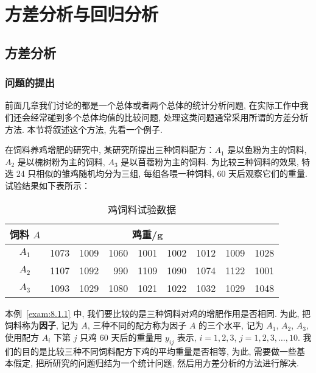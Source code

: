 \setcounter{chapter}{7}
\chapter{方差分析与回归分析}\label{cha:8}

\section{方差分析}\label{sec:8.1}
\subsection{问题的提出}
前面几章我们讨论的都是一个总体或者两个总体的统计分析问题, 在实际工作中我们还会经常碰到多个总体均值的比较问题, 处理这类问题通常采用所谓的方差分析方法. 本节将叙述这个方法, 先看一个例子.

\begin{example}\label{exam:8.1.1}
在饲料养鸡增肥的研究中, 某研究所提出三种饲料配方：$A_1$ 是以鱼粉为主的饲料, $A_2$ 是以槐树粉为主的饲料, $A_3$ 是以苜蓿粉为主的饲料. 为比较三种饲料的效果, 特选 24 只相似的雏鸡随机均分为三组, 每组各喂一种饲料, 60 天后观察它们的重量. 试验结果如下表所示：

\begin{table}[htbp]
  \centering
  \caption{鸡饲料试验数据}
    \begin{tabular}{c|rrrrrrrr}
    \toprule
    饲料 $A$   & \multicolumn{7}{c}{鸡重/\si{\gram}                     } &      \\
    \midrule
    $A_1$  & 1073  & 1009  & 1060  & 1001  & 1002  & 1012  & 1009  & 1028 \\
    $A_2$  & 1107  & 1092  & 990   & 1109  & 1090  & 1074  & 1122  & 1001 \\
    $A_3$  & 1093  & 1029  & 1080  & 1021  & 1022  & 1032  & 1029  & 1048 \\
    \bottomrule
    \end{tabular}%
  \label{tab:8.1.1}%
\end{table}%
\end{example}

本例~\ref{exam:8.1.1} 中, 我们要比较的是三种饲料对鸡的增肥作用是否相同. 为此, 把饲料称为\textbf{因子}, 记为 $A$, 三种不同的配方称为因子 $A$ 的三个水平, 记为 $A_1$, $A_2$, $A_3$, 使用配方 $A_i$ 下第 $j$ 只鸡 60 天后的重量用 $y_{ij}$ 表示, $i = 1,2,3$, $j =1,2,3,\ldots,10$. 我们的目的是比较三种不同饲料配方下鸡的平均重量是否相等, 为此, 需要做一些基本假定, 把所研究的问题归结为一个统计问题, 然后用方差分析的方法进行解决.

